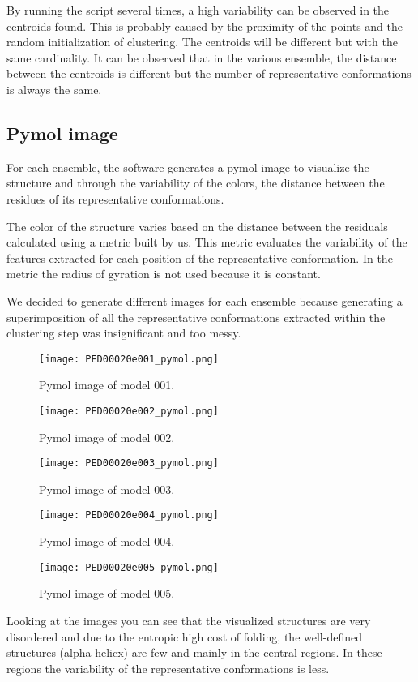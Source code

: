 By running the script several times, a high variability can be observed in the centroids found.
This is probably caused by the proximity of the points and the random initialization of clustering. The centroids will be different but with the same cardinality.
%
It can be observed that in the various ensemble, the distance between the centroids is different but the number of representative conformations is always the same.
%


\subsection{Pymol image}
For each ensemble, the software generates a pymol image to visualize the structure and through the variability of the colors, the distance between the residues of its representative conformations.

The color of the structure varies based on the distance between the residuals calculated using a metric built by us. This metric evaluates the variability of the features extracted for each position of the representative conformation. In the metric the radius of gyration is not used because it is constant.

We decided to generate different images for each ensemble because generating a superimposition of all the representative conformations extracted within the clustering step was insignificant and too messy.

\begin{figure}[H]
	\begin{minipage}[b]{0.47\textwidth}
		\centering
		\texttt{[image: PED00020e001\_pymol.png]}
		\caption{Pymol image of model 001.}
		\label{model001}
	\end{minipage}
	\hfill
	\begin{minipage}[b]{0.47\textwidth}
		\centering
		\texttt{[image: PED00020e002\_pymol.png]}
		\caption{Pymol image of model 002.}
		\label{model002}
	\end{minipage}
	\hfill
	\begin{minipage}[b]{0.47\textwidth}
		\centering
		\texttt{[image: PED00020e003\_pymol.png]}
		\caption{Pymol image of model 003.}
		\label{model003}
	\end{minipage}
	\begin{minipage}[b]{0.47\textwidth}
		\centering
		\texttt{[image: PED00020e004\_pymol.png]}
		\caption{Pymol image of model 004.}
		\label{model004}
	\end{minipage}
	\hfill
	\begin{minipage}[b]{0.47\textwidth}
		\centering
		\texttt{[image: PED00020e005\_pymol.png]}
		\caption{Pymol image of model 005.}
		\label{model005}
	\end{minipage}
\end{figure}

Looking at the images you can see that the visualized structures are very disordered and due to the entropic high cost of folding, the well-defined structures (alpha-helicx) are few and mainly in the central regions. In these regions the variability of the representative conformations is less.

